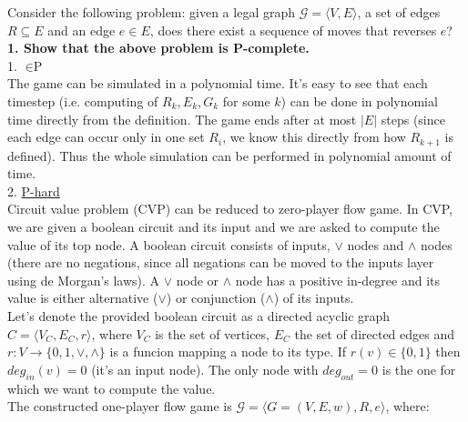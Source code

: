 Consider the following problem: given a legal graph
$\mathcal{G} = \langle V, E \rangle$, a set of edges $R \subseteq E$ and an
edge $e \in E$, does there exist a sequence of moves that reverses $e$?\\
\textbf{1. Show that the above problem is P-complete.}\\
1. \underline{$\in \text{P}$}\\
The game can be simulated in a polynomial time. It's easy to see that each timestep (i.e. computing of $R_k, E_k, G_k$
for some $k$) can be done in polynomial time directly from the definition. The game ends after
at most $|E|$ steps (since each edge can occur only in one set $R_i$, we know this directly from
how $R_{k+1}$ is defined). Thus the whole simulation can be performed in polynomial amount of time.\\
2. \underline{P-hard}\\
Circuit value problem (CVP) can be reduced to zero-player flow game.
In CVP, we are given a boolean circuit and its input and we are asked to compute the value of its top node.
A boolean circuit consists of inputs, $\lor$ nodes and $\land$ nodes (there are no
negations, since all negations can be moved to the inputs layer using de Morgan's laws).
A $\lor$ node or $\land$ node has a positive in-degree and its value is either alternative ($\lor$)
or conjunction ($\land$) of its inputs.\\
Let's denote the provided boolean circuit as a directed acyclic graph $C = \langle V_C, E_C, r \rangle$,
where $V_C$ is the set of vertices, $E_C$ the set of directed edges and $r: V \rightarrow \{0,1,\lor,\land\}$
is a funcion mapping a node to its type. If $r(v) \in \{0,1\}$ then $deg_{in}(v) = 0$ (it's an input node).
The only node with $deg_{out} = 0$ is the one for which we want to compute the value.\\
The constructed one-player flow game is $\mathcal{G} = \langle G = (V, E, w), R, e \rangle$, where:
